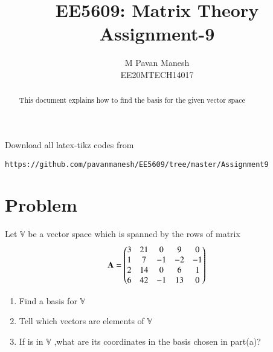 \documentclass[journal,12pt,twocolumn]{IEEEtran}
\begin{document}
     \def\rightbox#1{\makebox[0in][r]{#1}}
     \def\centbox#1{\makebox[0in]{#1}}
     \def\topbox#1{\raisebox{-\baselineskip}[0in][0in]{#1}}
     \def\midbox#1{\raisebox{-0.5\baselineskip}[0in][0in]{#1}}
\vspace{3cm}
\title{EE5609: Matrix Theory\\
          Assignment-9\\}
\author{M Pavan Manesh\\
EE20MTECH14017 }
\maketitle
\newpage
\bigskip
\renewcommand{\thefigure}{\theenumi}
\renewcommand{\thetable}{\theenumi}
\begin{abstract}
This document explains how to find the basis for the given vector space
\end{abstract}
Download all latex-tikz codes from 
%
\begin{lstlisting}
https://github.com/pavanmanesh/EE5609/tree/master/Assignment9
\end{lstlisting}
%
\section{Problem}
Let $\mathbb{V}$ be a vector space which is spanned by the rows of matrix
\begin{align}
    \mathbf{A} = \begin{pmatrix}3&21&0&9&0\\1&7&-1&-2&-1\\2&14&0&6&1\\6&42&-1&13&0\end{pmatrix}\label{eq:mat}
\end{align}
\begin{enumerate}[label=\alph*.]
\item Find a basis for $\mathbb{V}$
\item Tell which vectors  are elements of $\mathbb{V}$ 
\item If  is in $\mathbb{V}$ ,what are its coordinates in the basis chosen in part(a)?
\end{enumerate}
\end{document}
